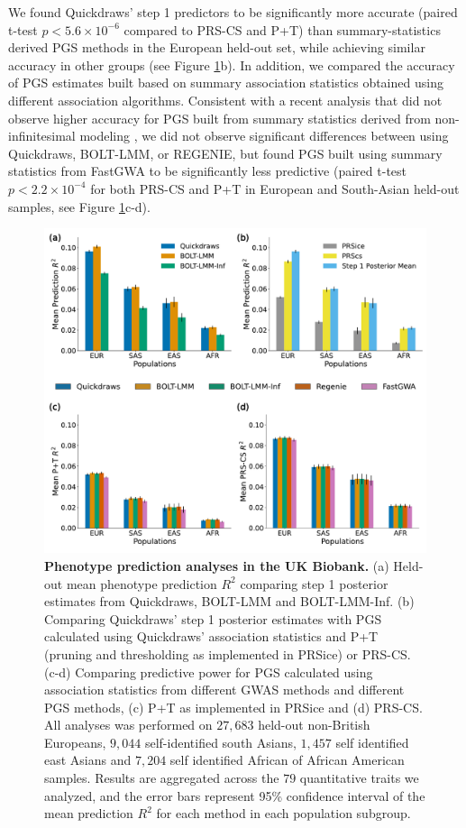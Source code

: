 %
We found Quickdraws' step 1 predictors to be significantly more accurate (paired t-test  $p < 5.6 \times 10^{-6}$ compared to PRS-CS and P+T) than summary-statistics derived PGS methods in the European held-out set, while achieving similar accuracy in other groups (see Figure \ref{fig:ukb_pgs}b).
%
In addition, we compared the accuracy of PGS estimates built based on summary association statistics obtained using different association algorithms.
%
Consistent with a recent analysis that did not observe higher accuracy for PGS built from summary statistics derived from non-infinitesimal modeling \cite{weissbrod2022leveraging}, we did not observe significant differences between using Quickdraws, BOLT-LMM, or REGENIE, but found PGS built using summary statistics from FastGWA to be significantly less predictive (paired t-test $p < 2.2 \times 10^{-4}$ for both PRS-CS and P+T in European and South-Asian held-out samples, see Figure \ref{fig:ukb_pgs}c-d).
%

\begin{figure}[h!]
    \centering
    \includegraphics[width=\textwidth]{figures/qd_panel_pgs.pdf}
    \caption{\textbf{Phenotype prediction analyses in the UK Biobank.} (a) Held-out mean phenotype prediction $R^2$ comparing step 1 posterior estimates from Quickdraws, BOLT-LMM and BOLT-LMM-Inf. (b) Comparing Quickdraws' step 1 posterior estimates with PGS calculated using Quickdraws' association statistics and P+T (pruning and thresholding as implemented in PRSice) or PRS-CS. (c-d) Comparing predictive power for PGS calculated using association statistics from different GWAS methods and different PGS methods, (c) P+T as implemented in PRSice and (d) PRS-CS. All analyses was performed on $27{,}683$ held-out non-British Europeans, $9{,}044$ self-identified south Asians, $1{,}457$ self identified east Asians and $7{,}204$ self identified African of African American samples. Results are aggregated across the $79$ quantitative traits we analyzed, and the error bars represent 95\% confidence interval of the mean prediction $R^2$ for each method in each population subgroup.}
    \label{fig:ukb_pgs}
\end{figure}

